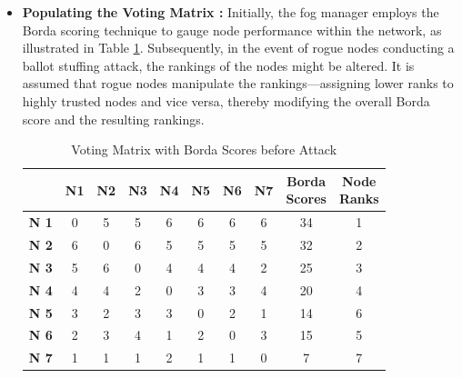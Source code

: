 \documentclass{sn-jnl}%
\begin{document}
\begin{itemize}
\item \textbf{Populating the Voting Matrix :}
Initially, the fog manager employs the Borda scoring technique to gauge node performance within the network, as illustrated in Table \ref{tab:borda_ranks_bef_attack}. Subsequently, in the event of rogue nodes conducting a ballot stuffing attack, the rankings of the nodes might be altered. It is assumed that rogue nodes manipulate the rankings—assigning lower ranks to highly trusted nodes and vice versa, thereby modifying the overall Borda score and the resulting rankings. 
\begin{table}[htbp]
\centering
\caption{Voting Matrix with Borda Scores before Attack}
\label{tab:borda_ranks_bef_attack}
\begin{tabular}{|c|*{7}{c|}c|c|}
\hline
 & \textbf{N1} & \textbf{N2} & \textbf{N3} & \textbf{N4} & \textbf{N5} & \textbf{N6} & \textbf{N7} & \makecell{\textbf{Borda} \\ \textbf{Scores}} & \makecell{\textbf{Node} \\ \textbf{Ranks}} \\
\hline
\textbf{N 1} & 0 & 5 & 5 & 6 & 6 & 6 & 6 & 34 & 1 \\
\hline
\textbf{N 2} & 6 & 0 & 6 & 5 & 5 & 5 & 5 & 32 & 2 \\
\hline
\textbf{N 3} & 5 & 6 & 0 & 4 & 4 & 4 & 2 & 25 & 3 \\
\hline
\textbf{N 4} & 4 & 4 & 2 & 0 & 3 & 3 & 4 & 20 & 4 \\
\hline
\textbf{N 5} & 3 & 2 & 3 & 3 & 0 & 2 & 1 & 14 & 6 \\
\hline
\textbf{N 6} & 2 & 3 & 4 & 1 & 2 & 0 & 3 & 15 & 5 \\
\hline
\textbf{N 7} & 1 & 1 & 1 & 2 & 1 & 1 & 0 & 7 & 7 \\
\hline
\end{tabular}
\end{table}



\end{itemize}
\end{document}
